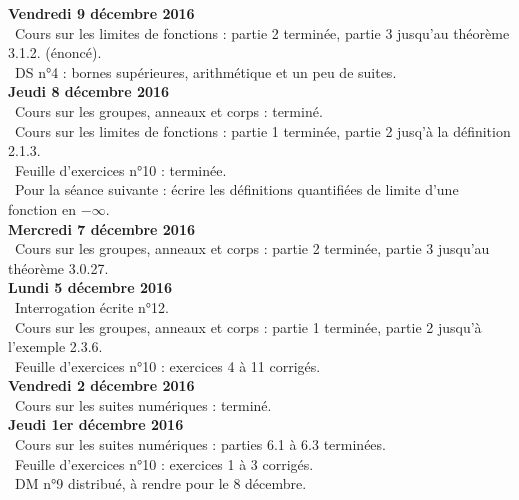 \documentclass[12pt,a4paper]{article}
\begin{document}
\noindent\textbf{Vendredi 9 décembre 2016}\\
\bu\ Cours sur les limites de fonctions : partie 2 terminée, partie 3 jusqu'au théorème 3.1.2. (énoncé).\\
\bu\ DS n°4 : bornes supérieures, arithmétique et un peu de suites. \vspace{.4cm}\\

\noindent\textbf{Jeudi 8 décembre 2016}\\
\bu\ Cours sur les groupes, anneaux et corps : terminé.\\
\bu\ Cours sur les limites de fonctions : partie 1 terminée, partie 2 jusq'à la définition 2.1.3.\\
\bu\ Feuille d'exercices n°10 : terminée.\\
\bu\ Pour la séance suivante : écrire les définitions quantifiées de limite d'une fonction en $-\infty$. \vspace{.4cm}\\

\noindent\textbf{Mercredi 7 décembre 2016}\\
\bu\ Cours sur les groupes, anneaux et corps :  partie 2 terminée, partie 3 jusqu'au théorème 3.0.27.\vspace{.4cm}\\

\noindent\textbf{Lundi 5 décembre 2016}\\
\bu\ Interrogation écrite n°12.\\
\bu\ Cours sur les groupes, anneaux et corps :  partie 1 terminée, partie 2 jusqu'à l'exemple 2.3.6.\\
\bu\ Feuille d'exercices n°10 : exercices 4 à 11 corrigés.\vspace{.4cm}\\

\noindent\textbf{Vendredi 2 décembre 2016}\\
\bu\ Cours sur les suites numériques : terminé.\vspace{.4cm}\\

\noindent\textbf{Jeudi 1er décembre 2016}\\
\bu\ Cours sur les suites numériques : parties 6.1 à 6.3 terminées. \\
\bu\ Feuille d'exercices n°10 : exercices 1 à 3 corrigés. \\
\bu\ DM n°9 distribué, à rendre pour le 8 décembre.\vspace{.4cm}\\
\end{document}
